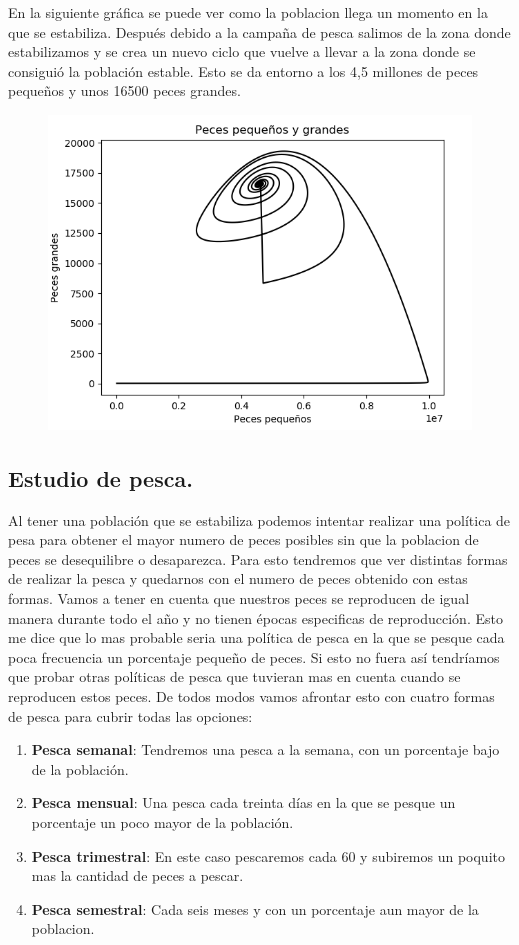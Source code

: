 \documentclass[]{article}
\begin{document}
En la siguiente gráfica se puede ver como la poblacion llega un momento en la que se estabiliza. Después debido a la campaña de pesca salimos de la zona donde estabilizamos y se crea un nuevo ciclo que vuelve a llevar a la zona donde se consiguió la población estable. Esto se da entorno a los 4,5 millones de peces pequeños y unos 16500 peces grandes.
\begin{figure}[H]
	\centering
	\includegraphics[width=0.7\linewidth]{img/screenshot0031}
	\caption{}
	\label{fig:screenshot0031}
\end{figure}




\subsection{Estudio de pesca.}
Al tener una población que se estabiliza podemos intentar realizar una política de pesa para obtener el mayor numero de peces posibles sin que la poblacion de peces se desequilibre o desaparezca. Para esto tendremos que ver distintas formas de realizar la pesca y quedarnos con el numero de peces obtenido con estas formas. Vamos a tener en cuenta que nuestros peces se reproducen de igual manera durante todo el año y no tienen épocas especificas de reproducción. Esto me dice que lo mas probable seria una política de pesca en la que se pesque cada poca frecuencia un porcentaje pequeño de peces. Si esto no fuera así tendríamos que probar otras políticas de pesca que tuvieran mas en cuenta cuando se reproducen estos peces. De todos modos vamos afrontar esto con cuatro formas de pesca para cubrir todas las opciones:

\begin{enumerate}
	\item \textbf{Pesca semanal}: Tendremos una pesca a la semana, con un porcentaje bajo de la población. 
	\item \textbf{Pesca mensual}: Una pesca cada treinta días en la que se pesque un porcentaje un poco mayor de la población. 
	\item \textbf{Pesca trimestral}: En este caso pescaremos cada 60 y subiremos un poquito mas la cantidad de peces a pescar.
	\item \textbf{Pesca semestral}: Cada seis meses y con un porcentaje aun mayor de la poblacion.
\end{enumerate}
\end{document}
